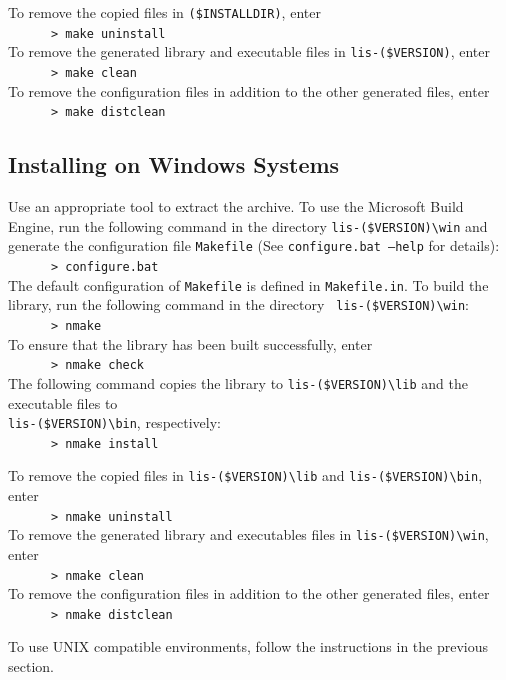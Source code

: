 \documentclass[a4paper]{article}
\begin{document}
To remove the copied files in {\tt (\$INSTALLDIR)}, enter 
\\
 \verb+      > make uninstall+\\
To remove the generated library and executable files
in {\tt lis-(\$VERSION)}, enter 
\\
 \verb+      > make clean+\\
To remove the configuration files in addition to the other
generated files, enter 
\\
 \verb+      > make distclean+

\subsection{Installing on Windows Systems}
Use an appropriate tool to extract the archive. 
To use the Microsoft Build Engine, run the following command in the directory 
{\tt lis-(\$VERSION)\textbackslash win} 
and generate the configuration file {\tt Makefile} (See {\tt configure.bat --help} 
for details): \\
 \verb+      > configure.bat+\\
The default configuration of {\tt Makefile} is defined in {\tt Makefile.in}.
To build the library, run the following command in the directory {\tt
lis-(\$VERSION)\textbackslash win}: \\
 \verb+      > nmake+\\
To ensure that the library has been built successfully, enter\\
 \verb+      > nmake check+\\
The following command copies the library to {\tt lis-(\$VERSION)\textbackslash lib}
and the executable files to\\
{\tt lis-(\$VERSION)\textbackslash bin}, respectively:\\
 \verb+      > nmake install+

To remove the copied files in
{\tt lis-(\$VERSION)\textbackslash lib}
and {\tt lis-(\$VERSION)\textbackslash bin}, enter 
\\
 \verb+      > nmake uninstall+\\
To remove the generated library and executables files in
{\tt lis-(\$VERSION)\textbackslash win}, enter 
\\
 \verb+      > nmake clean+\\
To remove the configuration files in addition to the other
generated files, enter 
\\
 \verb+      > nmake distclean+

To use UNIX compatible environments, follow the instructions in the
previous section. 
\end{document}
